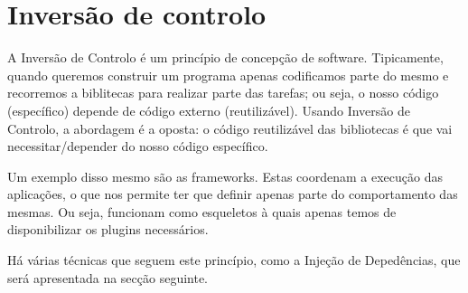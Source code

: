 \section{Inversão de controlo}

A Inversão de Controlo é um princípio de concepção de software. Tipicamente, quando queremos construir um programa apenas codificamos parte do mesmo e recorremos a biblitecas para realizar parte das tarefas; ou seja, o nosso código (específico) depende de código externo (reutilizável). Usando Inversão de Controlo, a abordagem é a oposta: o código reutilizável das bibliotecas é que vai necessitar/depender do nosso código específico.

Um exemplo disso mesmo são as frameworks. Estas coordenam a execução das aplicações, o que nos permite ter que definir apenas parte do comportamento das mesmas. Ou seja, funcionam como esqueletos à quais apenas temos de disponibilizar os plugins necessários.

Há várias técnicas que seguem este princípio, como a Injeção de Depedências, que será apresentada na secção seguinte.
